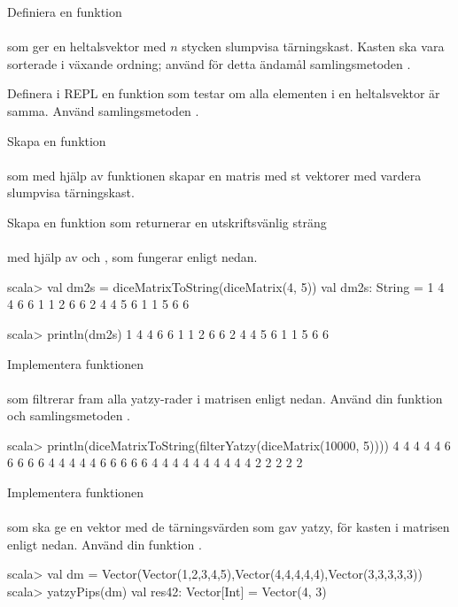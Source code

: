 \Subtask Definiera en funktion \\ \\ som ger en heltalsvektor med $n$ stycken slumpvisa tärningskast. Kasten ska vara sorterade i växande ordning; använd för detta ändamål samlingsmetoden .


\Subtask \label{matrices:subtask:isyatzyforall} Definera i REPL en funktion  som testar om alla elementen i en heltalsvektor är samma. Använd samlingsmetoden .


\Subtask Skapa en funktion  \\  \\ som med hjälp av funktionen  skapar en matris med  st vektorer med vardera  slumpvisa tärningskast.


\Subtask \label{matrices:subtask:diceMatrixToString} Skapa en funktion som returnerar en utskriftsvänlig sträng \\  \\med hjälp av  och , som fungerar enligt nedan.
\begin{REPL}
scala> val dm2s = diceMatrixToString(diceMatrix(4, 5))
val dm2s: String = 1 4 4 6 6
1 1 2 6 6
2 4 4 5 6
1 1 5 6 6

scala> println(dm2s)
1 4 4 6 6
1 1 2 6 6
2 4 4 5 6
1 1 5 6 6
\end{REPL}



\Subtask Implementera funktionen \\  \\ som filtrerar fram alla yatzy-rader i matrisen  enligt nedan. Använd din funktion  och samlingsmetoden .
\begin{REPL}
scala> println(diceMatrixToString(filterYatzy(diceMatrix(10000, 5))))
4 4 4 4 4
6 6 6 6 6
4 4 4 4 4
6 6 6 6 6
4 4 4 4 4
4 4 4 4 4
2 2 2 2 2
\end{REPL}



\Subtask Implementera funktionen \\
\\
som ska ge en vektor med de tärningsvärden som gav yatzy, för kasten i matrisen  enligt nedan. Använd din funktion .
\begin{REPL}
scala> val dm = Vector(Vector(1,2,3,4,5),Vector(4,4,4,4,4),Vector(3,3,3,3,3))
scala> yatzyPips(dm)
val res42: Vector[Int] = Vector(4, 3)
\end{REPL}

